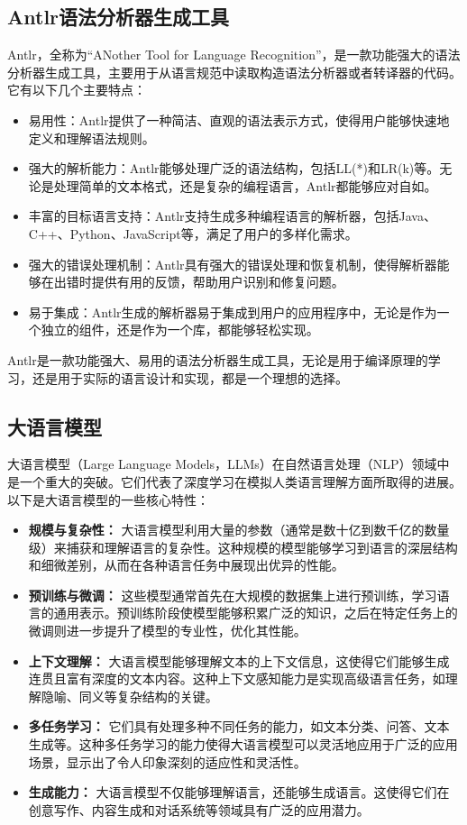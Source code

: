 \subsection{Antlr语法分析器生成工具}

Antlr，全称为“ANother Tool for Language Recognition”，是一款功能强大的语法分析器生成工具，主要用于从语言规范中读取构造语法分析器或者转译器的代码。它有以下几个主要特点：

\begin{itemize}
    \item 易用性：Antlr提供了一种简洁、直观的语法表示方式，使得用户能够快速地定义和理解语法规则。
    \item 强大的解析能力：Antlr能够处理广泛的语法结构，包括LL(*)和LR(k)等。无论是处理简单的文本格式，还是复杂的编程语言，Antlr都能够应对自如。
    \item 丰富的目标语言支持：Antlr支持生成多种编程语言的解析器，包括Java、C++、Python、JavaScript等，满足了用户的多样化需求。
    \item 强大的错误处理机制：Antlr具有强大的错误处理和恢复机制，使得解析器能够在出错时提供有用的反馈，帮助用户识别和修复问题。
    \item 易于集成：Antlr生成的解析器易于集成到用户的应用程序中，无论是作为一个独立的组件，还是作为一个库，都能够轻松实现。
\end{itemize}

Antlr是一款功能强大、易用的语法分析器生成工具，无论是用于编译原理的学习，还是用于实际的语言设计和实现，都是一个理想的选择。

\subsection{大语言模型}
大语言模型（Large Language Models，LLMs）在自然语言处理（NLP）领域中是一个重大的突破。它们代表了深度学习在模拟人类语言理解方面所取得的进展。以下是大语言模型的一些核心特性：

\begin{itemize}
    \item \textbf{规模与复杂性：} 大语言模型利用大量的参数（通常是数十亿到数千亿的数量级）来捕获和理解语言的复杂性。这种规模的模型能够学习到语言的深层结构和细微差别，从而在各种语言任务中展现出优异的性能。
    \item \textbf{预训练与微调：} 这些模型通常首先在大规模的数据集上进行预训练，学习语言的通用表示。预训练阶段使模型能够积累广泛的知识，之后在特定任务上的微调则进一步提升了模型的专业性，优化其性能。
    \item \textbf{上下文理解：} 大语言模型能够理解文本的上下文信息，这使得它们能够生成连贯且富有深度的文本内容。这种上下文感知能力是实现高级语言任务，如理解隐喻、同义等复杂结构的关键。
    \item \textbf{多任务学习：} 它们具有处理多种不同任务的能力，如文本分类、问答、文本生成等。这种多任务学习的能力使得大语言模型可以灵活地应用于广泛的应用场景，显示出了令人印象深刻的适应性和灵活性。
    \item \textbf{生成能力：} 大语言模型不仅能够理解语言，还能够生成语言。这使得它们在创意写作、内容生成和对话系统等领域具有广泛的应用潜力。
\end{itemize}

